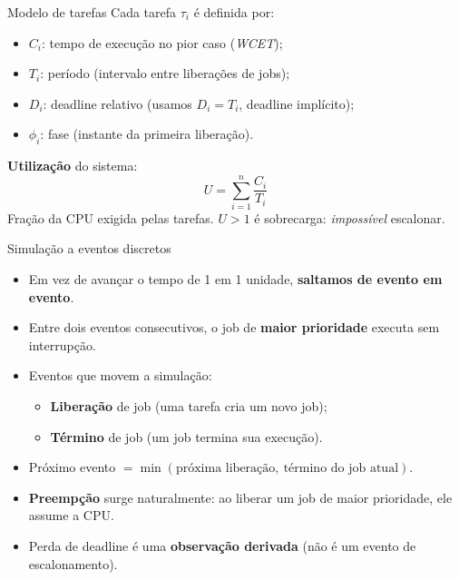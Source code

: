 \documentclass[aspectratio=169,xcolor=table]{beamer}
\begin{document}
\begin{frame}{Modelo de tarefas}
    Cada tarefa $\tau_i$ é definida por:
    \begin{itemize}
        \item $C_i$: tempo de execução no pior caso (\emph{WCET});
        \item $T_i$: período (intervalo entre liberações de jobs);
        \item $D_i$: deadline relativo (usamos $D_i = T_i$, deadline implícito);
        \item $\phi_i$: fase (instante da primeira liberação).
    \end{itemize}
    \vspace{0.4em}
    \textbf{Utilização} do sistema:
    \[
        U = \sum_{i=1}^{n} \frac{C_i}{T_i}
    \]
    Fração da CPU exigida pelas tarefas. $U > 1$ é sobrecarga: \emph{impossível} escalonar.
\end{frame}

\begin{frame}{Simulação a eventos discretos}
    \begin{itemize}
        \item Em vez de avançar o tempo de 1 em 1 unidade, \textbf{saltamos de evento em evento}.
        \item Entre dois eventos consecutivos, o job de \textbf{maior prioridade} executa sem interrupção.
        \item Eventos que movem a simulação:
        \begin{itemize}
            \item \textbf{Liberação} de job (uma tarefa cria um novo job);
            \item \textbf{Término} de job (um job termina sua execução).
        \end{itemize}
        \item Próximo evento $=\min(\text{próxima liberação},\ \text{término do job atual})$.
        \item \textbf{Preempção} surge naturalmente: ao liberar um job de maior prioridade, ele assume a CPU.
        \item Perda de deadline é uma \textbf{observação derivada} (não é um evento de escalonamento).
    \end{itemize}
\end{frame}
\end{document}
